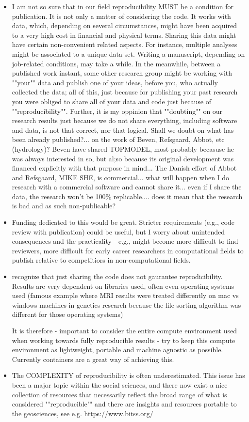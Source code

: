 \documentclass{article}
\begin{document}
\begin{itemize}
	\item I am not so sure that in our field reproducibility MUST be a condition for publication. It is not only a matter of considering the code. It works with data, which, depending on several circumstances, might have been acquired to a very high cost in financial and physical terms. Sharing this data might have certain non-convenient related aspects. For instance, multiple analyses might be associated to a unique data set. Writing a manuscript, depending on job-related conditions, may take a while. In the meanwhile, between a published work instant, some other research group might be working with ""your"" data and publish one of your ideas, before you, who actually collected the data; all of this, just because for publishing your past research you were obliged to share all of your data and code just because of ""reproducibility"". Further, it is my oppinion that ""doubting"" on our research results just because we do not share everything, including software and data, is not that  correct, nor that logical. Shall we doubt on what has been already published?... on the work of Beven, Refsgaard, Abbot, etc (hydrology)? Beven have shared TOPMODEL, most probably becasuse he was always interested in so, but al;so because its original development was financed explicitly with that purpose in mind... The Danish effort of Abbot and Refsgaard, MIKE SHE, is commercial... what will happen when I do research with a commercial software and cannot share it... even if I share the data, the research won't be 100\% replicable.... does it mean that the research is bad and as such non-publicable?
	\item Funding dedicated to this would be great. Stricter requirements (e.g., code review with publication) could be useful, but I worry about unintended consequences and the practicality - e.g., might become more difficult to find reviewers, more difficult for early career researchers in computational fields to publish relative to competitiors in non-computational fields.
	\item recognize that just sharing the code does not gaurantee reprodicibility. Results are very dependent on libraries used, often even operating systems used (famous example where MRI results were treated differently on mac vs windows machines in genetics research because the file sorting algorithm was different for those operating systems)

It is therefore 
- important to consider the entire compute environment used when working towards fully reproducible results
- try to keep this compute environment as lightweight, portable and machine agnostic as possible. Currently containers are a great way of achieving this.
	\item The COMPLEXITY of reproducibility is often underestimated. This issue has been a major topic within the social sciences, and there now exist a nice collection of resources that necessarily reflect the broad range of what is considered ""reproducible"" and there are insights and resources portable to the geosciences, see e.g. https://www.bitss.org/
\end{itemize}
\end{document}
